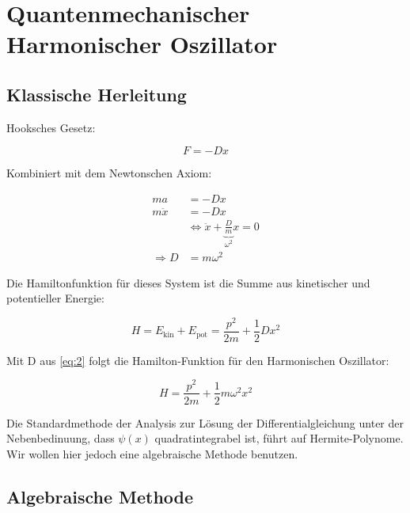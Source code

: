 



\section*{Quantenmechanischer Harmonischer Oszillator}

\subsection{Klassische Herleitung}


Hooksches Gesetz:

\begin{equation}
  \label{eq:1}
  F = -Dx
\end{equation}

Kombiniert mit dem Newtonschen Axiom:

\begin{align}
  ma &= -Dx  \\
  m\ddot x &= -Dx \\
&\Leftrightarrow \ddot x + \underbrace{\frac{D}{m}}_{\omega^2}x = 0 \\
\Rightarrow D &= m\omega^2\label{eq:2}
\end{align}

Die Hamiltonfunktion für dieses System ist die Summe aus kinetischer und potentieller Energie:

\begin{equation}
  \label{eq:3}
  H = E_{\text{kin}}+E_{\text{pot}} = \frac{p^2}{2m} + \frac{1}{2}Dx^2
\end{equation}

Mit D aus \eqref{eq:2} folgt die Hamilton-Funktion für den Harmonischen Oszillator:

\begin{equation}
  \label{eq:4}
  \boxed{ H = \frac{p^2}{2m} +  \frac{1}{2}m\omega^2x^2}
\end{equation}


Die Standardmethode der Analysis zur Lösung der Differentialgleichung unter der Nebenbedinuung, dass \(\psi(x)\) quadratintegrabel ist, führt auf Hermite-Polynome. Wir wollen hier jedoch eine algebraische Methode benutzen.

\subsection{Algebraische Methode}

